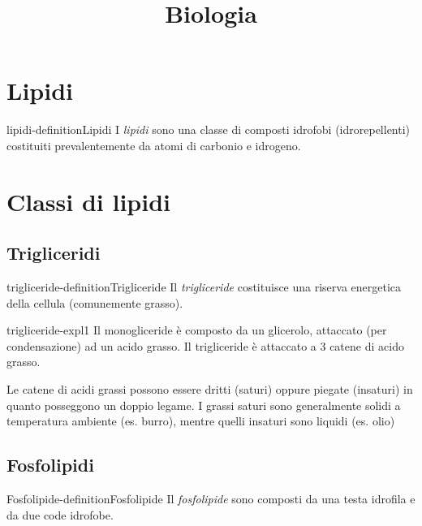 \documentclass[preview]{standalone}
\begin{document}
\title{Biologia}
\genpage

\section{Lipidi}

\begin{snippetdefinition}{lipidi-definition}{Lipidi}
    I \textit{lipidi} sono una classe di composti idrofobi (idrorepellenti)
    costituiti prevalentemente da atomi di carbonio e idrogeno.
\end{snippetdefinition}


\section{Classi di lipidi}

\subsection{Trigliceridi}

\begin{snippetdefinition}{trigliceride-definition}{Trigliceride}
    Il \textit{trigliceride} costituisce una riserva energetica della cellula (comunemente grasso).
\end{snippetdefinition}

\begin{snippet}{trigliceride-expl1}
    Il monogliceride è composto da un glicerolo, attaccato (per condensazione) ad un acido grasso.
    Il trigliceride è attaccato a 3 catene di acido grasso.

    Le catene di acidi grassi possono essere dritti (saturi) oppure piegate (insaturi)
    in quanto posseggono un doppio legame.
    I grassi saturi sono generalmente solidi a temperatura ambiente (es. burro),
    mentre quelli insaturi sono liquidi (es. olio)
\end{snippet}


\subsection{Fosfolipidi}

\begin{snippetdefinition}{Fosfolipide-definition}{Fosfolipide}
    Il \textit{fosfolipide} sono composti da una testa idrofila e da due code idrofobe.
\end{snippetdefinition}
\end{document}
